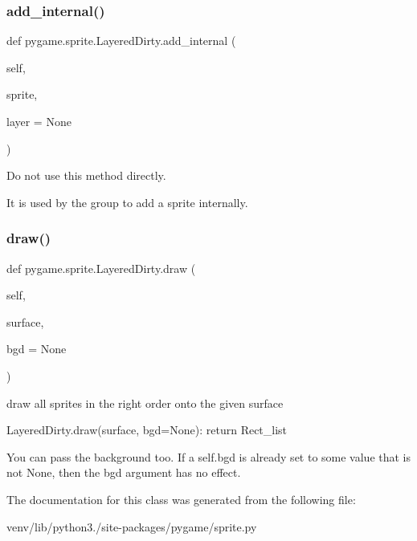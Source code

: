 \subsubsection{\texorpdfstring{add\+\_\+internal()}{add\_internal()}}
{\footnotesize\ttfamily def pygame.\+sprite.\+Layered\+Dirty.\+add\+\_\+internal (\begin{DoxyParamCaption}\item[{}]{self,  }\item[{}]{sprite,  }\item[{}]{layer = {\ttfamily None} }\end{DoxyParamCaption})}

\begin{DoxyVerb}Do not use this method directly.

It is used by the group to add a sprite internally.\end{DoxyVerb}
 \mbox{\label{classpygame_1_1sprite_1_1_layered_dirty_a8b4d69e07b671c7a0b9db83a94e5a5da}} 
\subsubsection{\texorpdfstring{draw()}{draw()}}
{\footnotesize\ttfamily def pygame.\+sprite.\+Layered\+Dirty.\+draw (\begin{DoxyParamCaption}\item[{}]{self,  }\item[{}]{surface,  }\item[{}]{bgd = {\ttfamily None} }\end{DoxyParamCaption})}

\begin{DoxyVerb}draw all sprites in the right order onto the given surface

LayeredDirty.draw(surface, bgd=None): return Rect_list

You can pass the background too. If a self.bgd is already set to some
value that is not None, then the bgd argument has no effect.\end{DoxyVerb}
 

The documentation for this class was generated from the following file\+:\begin{DoxyCompactItemize}
\item 
venv/lib/python3./site-\/packages/pygame/sprite.\+py\end{DoxyCompactItemize}
